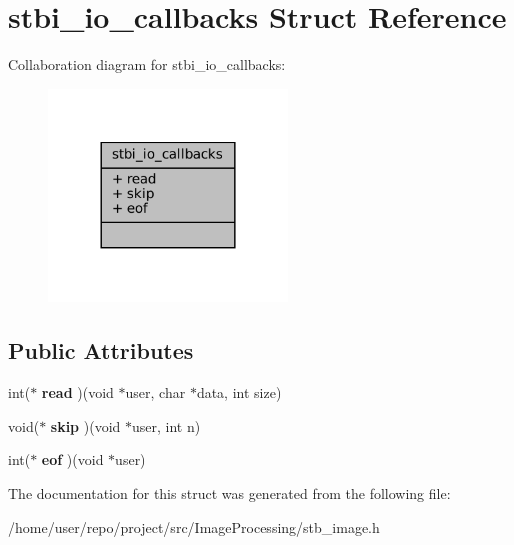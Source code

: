 \hypertarget{structstbi__io__callbacks}{}\section{stbi\+\_\+io\+\_\+callbacks Struct Reference}
\label{structstbi__io__callbacks}


Collaboration diagram for stbi\+\_\+io\+\_\+callbacks\+:\nopagebreak
\begin{figure}[H]
\begin{center}
\leavevmode
\includegraphics[width=180pt]{structstbi__io__callbacks__coll__graph}
\end{center}
\end{figure}
\subsection*{Public Attributes}
\begin{DoxyCompactItemize}
\item 
\mbox{\label{structstbi__io__callbacks_a73818f0a4f467e5abfefb1d635f62d82}} 
int($\ast$ {\bfseries read} )(void $\ast$user, char $\ast$data, int size)
\item 
\mbox{\label{structstbi__io__callbacks_a864be557872041ac06e1509caf05cc83}} 
void($\ast$ {\bfseries skip} )(void $\ast$user, int n)
\item 
\mbox{\label{structstbi__io__callbacks_a2c4f3c3b7c75a2e74a35caf74fb8d177}} 
int($\ast$ {\bfseries eof} )(void $\ast$user)
\end{DoxyCompactItemize}


The documentation for this struct was generated from the following file\+:\begin{DoxyCompactItemize}
\item 
/home/user/repo/project/src/\+Image\+Processing/stb\+\_\+image.\+h\end{DoxyCompactItemize}
